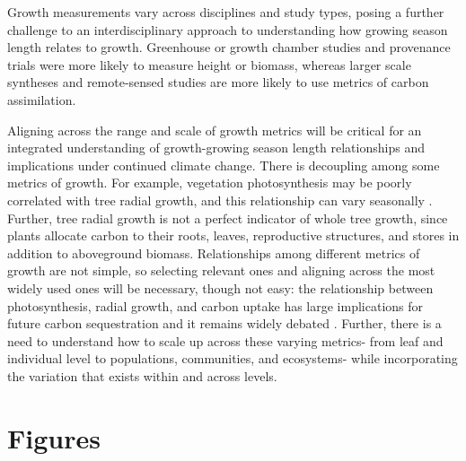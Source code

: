 \documentclass[11pt]{article}
\begin{document}
Growth measurements vary across disciplines and study types, posing a further challenge to an interdisciplinary approach to understanding how growing season length relates to growth. Greenhouse or growth chamber studies and provenance trials were more likely to measure height or biomass, whereas larger scale syntheses and remote-sensed studies are more likely to use metrics of carbon assimilation. 

Aligning across the range and scale of growth metrics will be critical for an integrated understanding of growth-growing season length relationships and implications under continued climate change.  There is decoupling among some metrics of growth. For example, vegetation photosynthesis may be poorly correlated with tree radial growth, and this relationship can vary seasonally \citep{cabon2022cross}. Further, tree radial growth is not a perfect indicator of whole tree growth, since plants allocate carbon to their roots, leaves, reproductive structures, and stores in addition to aboveground biomass. Relationships among different metrics of growth are not simple, so selecting relevant ones and aligning across the most widely used ones will be necessary, though not easy: the relationship  between photosynthesis, radial growth, and carbon uptake has large implications for future carbon sequestration and it remains widely debated \citep{green2022limits}. Further, there is a need to understand how to scale up across these varying metrics- from leaf and individual level to populations, communities, and ecosystems- while incorporating the variation that exists within and across levels.


\newpage
\section{Figures}
\end{document}

